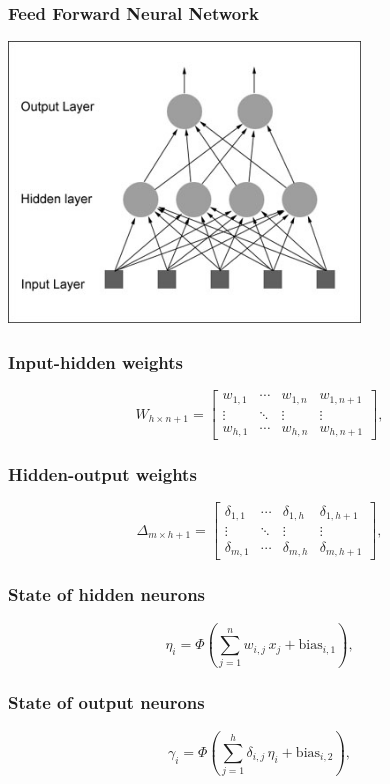 \begin{frame}
    \frametitle{Feed Forward Neural Network}
\includegraphics[width=0.7\textwidth]{simple_feedforward_network}
\end{frame}

\begin{frame}
    \frametitle{Input-hidden weights}
  \[
    W_{h \times {n+1}} =
    \left[
      \begin{array}{ccc|c}
        w_{1, 1} & \cdots & w_{1, n} & w_{1, n+1} \\
        \vdots   & \ddots & \vdots   & \vdots     \\
        w_{h, 1} & \cdots & w_{h, n} & w_{h, n+1}
      \end{array}
    \right],
  \]
\end{frame}

\begin{frame}
    \frametitle{Hidden-output weights}
  \[
    \Delta_{m \times h+1} =
    \left[
      \begin{array}{ccc|c}
        \delta_{1,1} & \cdots & \delta_{1,h} & \delta_{1,h+1}\\
        \vdots & \ddots &  \vdots & \vdots\\
        \delta_{m,1} & \cdots & \delta_{m,h} &\delta_{m,h+1}
      \end{array}
    \right],
  \]
\end{frame}

\begin{frame}
\frametitle{State of hidden neurons}
\[
  \eta_{i} =
  \Phi \left(
    \sum_{j=1}^{n}
    w_{i,j}\,x_j + \text{bias}_{i,1}
  \right),
\]
\end{frame}

\begin{frame}
\frametitle{State of output neurons}
\[
  \gamma_{i} =
  \Phi\left(
    \sum_{j=1}^{h}
    \delta_{i,j}\,\eta_i + \text{bias}_{i,2}
  \right),
\]
\end{frame}


